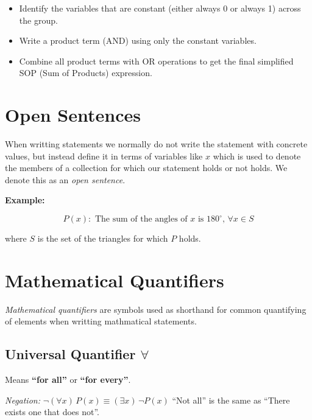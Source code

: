 \begin{enumerate}
	      \begin{itemize}

		      \item Identify the variables that are constant (either always 0 or always 1) across the group.

		      \item Write a product term (AND) using only the constant variables.

		      \item Combine all product terms with OR operations to get the final simplified SOP (Sum of
		            Products) expression.

	      \end{itemize}

\end{enumerate}

\section{Open Sentences}

When writting statements we normally do not write the statement with concrete values, but instead define it in terms of variables like
\(x\) which is used to denote the members of a collection for which our statement holds or not holds. We denote this as
an \emph{open sentence}.

\textbf{Example:}

\[
	P(x): \text{ The sum of the angles of } x \text{ is } 180^{\circ}, \, \forall x \in S
\]

where \(S\) is the set of the triangles for which \(P\) holds.

\section{Mathematical Quantifiers}

\emph{Mathematical quantifiers} are symbols used as shorthand for common quantifying of elements when writting mathmatical statements.

\subsection{Universal Quantifier \texorpdfstring{\(\forall\)}{}}

Means \textbf{``for all''} or \textbf{``for every''}.

\emph{Negation:} \(\neg (\forall x)\,P(x) \equiv (\exists x)\, \neg P(x)\) ``Not all'' is the same as
``There exists one that does not''.

